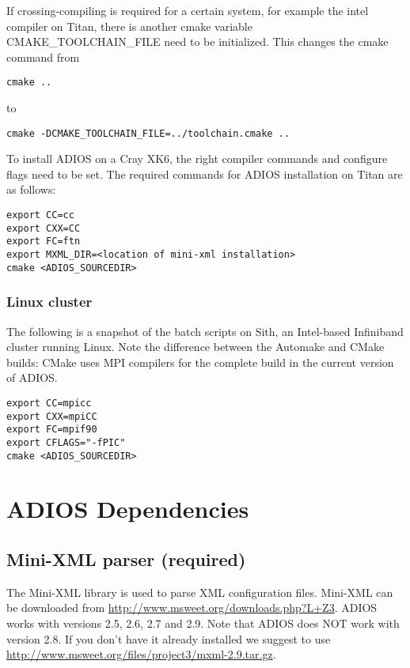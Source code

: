 If crossing-compiling is required for a certain system, for example the intel compiler on Titan,
there is another cmake variable CMAKE\_TOOLCHAIN\_FILE need to be initialized. This changes the cmake
command from

\begin{lstlisting}
cmake ..
\end{lstlisting}
to
\begin{lstlisting}
cmake -DCMAKE_TOOLCHAIN_FILE=../toolchain.cmake ..
\end{lstlisting}

To install ADIOS on a Cray XK6, the right compiler commands and configure flags
need to be set. The required commands for ADIOS installation on Titan are as follows:

\begin{lstlisting}
export CC=cc
export CXX=CC
export FC=ftn
export MXML_DIR=<location of mini-xml installation>
cmake <ADIOS_SOURCEDIR>
\end{lstlisting}


\subsubsection{Linux cluster}

The following is a snapshot of the batch scripts on Sith, an Intel-based Infiniband
cluster running Linux. Note the difference between the Automake and CMake builds:
CMake uses MPI compilers for the complete build in the current version of ADIOS.

\begin{lstlisting}
export CC=mpicc
export CXX=mpiCC
export FC=mpif90
export CFLAGS="-fPIC"
cmake <ADIOS_SOURCEDIR>
\end{lstlisting}


\section{ADIOS Dependencies}

\subsection{Mini-XML parser (required)}

The Mini-XML library is used to parse XML configuration files. Mini-XML can be
downloaded from \url{http://www.msweet.org/downloads.php?L+Z3}. ADIOS works with
versions 2.5, 2.6, 2.7 and 2.9. Note that ADIOS does NOT work with version 2.8.
If you don't have it already installed we suggest to use 
\url{http://www.msweet.org/files/project3/mxml-2.9.tar.gz}.

